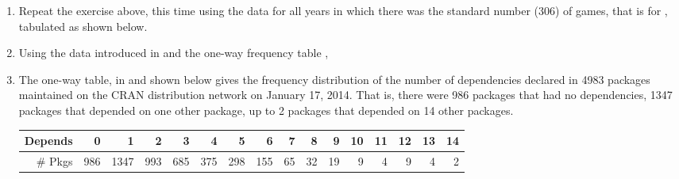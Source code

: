 \documentclass[11pt]{book}
\renewenvironment{knitrout}{\small\renewcommand{\baselinestretch}{.85}}{} %
\begin{document}
\begin{enumerate}
  \item \hard 
  Repeat the exercise above, this time using the data for all years in which there was
  the standard number (306) of games, that is for , tabulated as shown below.
\begin{knitrout}
\color{fgcolor}\begin{kframe}
\begin{alltt}
 \hlkwb{<-} \hlstd{(}\hlopt{~} \hlopt{+}  
            \hlopt{>}\hlstd{)}
\end{alltt}
\end{kframe}
\end{knitrout}



\item Using the data  introduced in 
and the one-way frequency table ,

\item \hard
  The one-way table,  in  and shown below gives the frequency
  distribution of the number of dependencies declared in 4983 \R packages
  maintained on the CRAN distribution network on January 17, 2014. That is, there were 986
  packages that had no dependencies, 1347 packages that depended on one other package, 
  up to 2 packages that depended on 14 other packages.

\begin{table}[ht]
\centering
\begin{tabular}{rrrrrrrrrrrrrrrr}
  \hline
Depends & 0 & 1 & 2 & 3 & 4 & 5 & 6 & 7 & 8 & 9 & 10 & 11 & 12 & 13 & 14 \\ 
  \hline
\# Pkgs & 986 & 1347 & 993 & 685 & 375 & 298 & 155 &  65 &  32 &  19 &   9 &   4 &   9 &   4 &   2 \\ 
   \hline
\end{tabular}
\end{table}


\end{enumerate}
\end{document}
